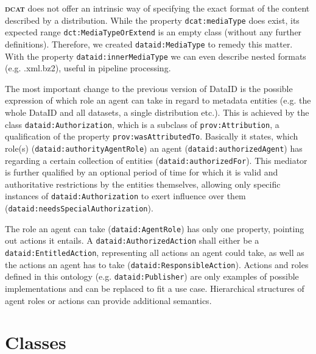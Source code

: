 \documentclass[a4paper,english,twoside,BCOR1.5cm,headsepline,DIV12,appendixprefix,final,12pt]{scrbook}
\newcommand{\dcat}{{\scshape\bfseries dcat}\xspace}
\newcommand{\prop}[1]{{{\texttt{#1}}}}
\begin{document}
\dcat does not offer an intrinsic way of specifying the exact format of the content described by a distribution. While the property \prop{dcat:mediaType} does exist, its expected range \prop{dct:MediaTypeOrExtend} is an empty class (without any further definitions).
Therefore, we created \prop{dataid:MediaType} to remedy this matter. With the property \prop{dataid:innerMediaType} we can even describe nested formats (e.g. .xml.bz2), useful in pipeline processing.

The most important change to the previous version of DataID is the possible expression of which role an agent can take in regard to metadata entities (e.g. the whole DataID and all datasets, a single distribution etc.). 
This is achieved by the class \prop{dataid:Authorization}, which is a subclass of \prop{prov:Attribution}, a qualification of the property \prop{prov:wasAttributedTo}. Basically it states, which role(s) (\prop{dataid:authorityAgentRole}) an agent (\prop{dataid:authorizedAgent}) has regarding a certain collection of entities (\prop{dataid:authorizedFor}). This mediator is further qualified by an optional period of time for which it is valid and authoritative restrictions by the entities themselves, allowing only specific instances of \prop{dataid:Authorization} to exert influence over them (\prop{dataid:needsSpecialAuthorization}).%


The role an agent can take (\prop{dataid:AgentRole}) has only one property, pointing out actions it entails. A \prop{dataid:AuthorizedAction} shall either be a \prop{dataid:EntitledAction}, representing all actions an agent could take, as well as the actions an agent has to take (\prop{dataid:ResponsibleAction}). Actions and roles defined in this ontology (e.g. \prop{dataid:Publisher}) are only examples of possible implementations and can be replaced to fit a use case. 
Hierarchical structures of agent roles or actions can provide additional semantics.

\section{Classes} 
\label{sec:coreclasses}
\end{document}
